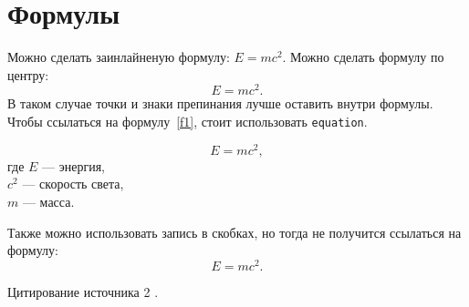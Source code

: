 \section{Формулы}

Можно сделать заинлайненую формулу: $E = mc^2$. Можно сделать формулу по центру: $$E = mc^2.$$ В таком случае точки и знаки препинания лучше оставить внутри формулы. Чтобы ссылаться на формулу~\ref{f1}, стоит использовать \texttt{equation}.

\begin{equation}\label{f1}
    E = mc^2,
\end{equation}
где $E$ --- энергия, \\ $c^2$ --- скорость света, \\ $m$ --- масса. 

Также можно использовать запись в скобках, но тогда не получится ссылаться на формулу:
\[
    E = mc^2.
\]



\lipsum[3]

Цитирование источника 2 \cite{cite_1_1}.
